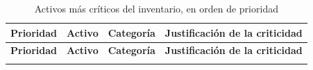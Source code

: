 \documentclass[11pt, a4paper, oneside]{report}
\begin{document}
\begin{xltabular}{\textwidth}{@{}|L{1.4cm}|L{3.2cm}|L{2.2cm}|X|@{}}
\caption{Activos más críticos del inventario, en orden de prioridad}
\label{tab:top_activos_criticos} \\

\parbox[c][1.1cm][c]{\linewidth}{\centering\color{white}\bfseries\small Prioridad} &
\parbox[c][1.1cm][c]{\linewidth}{\centering\color{white}\bfseries\small Activo} &
\parbox[c][1.1cm][c]{\linewidth}{\centering\color{white}\bfseries\small Categoría} &
\parbox[c][1.1cm][c]{\linewidth}{\centering\color{white}\bfseries\small Justificación de la criticidad} \\ \hline
\endfirsthead

\parbox[c][1.1cm][c]{\linewidth}{\centering\color{white}\bfseries\small Prioridad} &
\parbox[c][1.1cm][c]{\linewidth}{\centering\color{white}\bfseries\small Activo} &
\parbox[c][1.1cm][c]{\linewidth}{\centering\color{white}\bfseries\small Categoría} &
\parbox[c][1.1cm][c]{\linewidth}{\centering\color{white}\bfseries\small Justificación de la criticidad} \\ \hline
\endhead

\hline
\endfoot


\end{xltabular}
\end{document}
